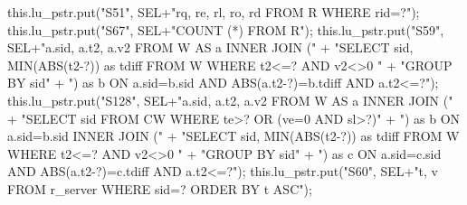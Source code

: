 \eatline
{}\nwendcode{}\endmoddef{}
this.lu_pstr.put("S51", SEL+"rq, re, rl, ro, rd FROM R WHERE rid=?");
\eatline
{}\nwendcode{}\endmoddef{}
this.lu_pstr.put("S67", SEL+"COUNT (*) FROM R");
\eatline
{}\nwendcode{}\endmoddef{}
this.lu_pstr.put("S59", SEL+"a.sid, a.t2, a.v2 FROM W AS a INNER JOIN ("
      + "SELECT sid, MIN(ABS(t2-?)) as tdiff FROM W WHERE t2<=? AND v2<>0 "
      + "GROUP BY sid"
      + ") as b ON a.sid=b.sid AND ABS(a.t2-?)=b.tdiff AND a.t2<=?");
\eatline
{}\nwendcode{}\endmoddef{}
this.lu_pstr.put("S128", SEL+"a.sid, a.t2, a.v2 FROM W AS a INNER JOIN ("
      + "SELECT sid FROM CW WHERE te>? OR (ve=0 AND sl>?)"
      + ") as b ON a.sid=b.sid INNER JOIN ("
      + "SELECT sid, MIN(ABS(t2-?)) as tdiff FROM W WHERE t2<=? AND v2<>0 "
      + "GROUP BY sid"
      + ") as c ON a.sid=c.sid AND ABS(a.t2-?)=c.tdiff AND a.t2<=?");
\eatline
{}\nwendcode{}\endmoddef{}
this.lu_pstr.put("S60", SEL+"t, v FROM r_server WHERE sid=? ORDER BY t ASC");
